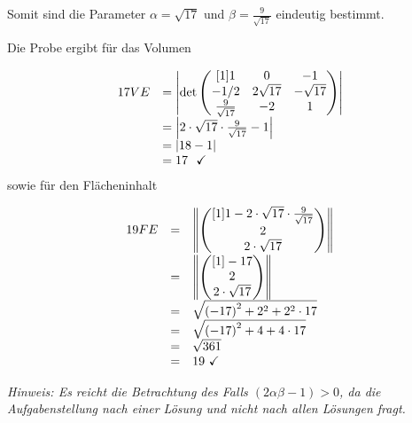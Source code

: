 \documentclass[main.tex]{subfiles}
\begin{document}
Somit sind die Parameter $\alpha =\sqrt{17}$ und $\beta =\frac{9}{\sqrt{17}}$ eindeutig bestimmt. 

Die Probe ergibt für das Volumen

\begin{equation*}
    \begin{array}{ r l }
    17VE & =\left| \det\begin{pmatrix}[1]
    1 & 0 & -1\\
    -1/2 & 2\sqrt{17} & -\sqrt{17}\\
    \frac{9}{\sqrt{17}} & -2 & 1
    \end{pmatrix}\right| \\
    & =\left| 2\cdot \sqrt{17} \cdot \frac{9}{\sqrt{17}} -1\right| \\
    & =| 18-1| \\
    & =17\ \ \checkmark 
    \end{array}
\end{equation*}
sowie für den Flächeninhalt

\begin{equation*}
    \begin{array}{ c r l }
        19FE & = & \left\| \begin{pmatrix}[1]
        1-2\cdot \sqrt{17} \cdot \frac{9}{\sqrt{17}}\\
        2\\
        2\cdot \sqrt{17}
        \end{pmatrix} \right\| \\
        & = & \left\| \begin{pmatrix}[1]
        -17\\
        2\\
        2\cdot \sqrt{17}
        \end{pmatrix} \right\| \\
        & = & \sqrt{{( -17)}^{2} +2^{2} +2^{2} \cdot 17}\\
        & = & \sqrt{{( -17)}^{2} +4+4\cdot 17}\\
        & = & \sqrt{361}\\
        & = & 19\ \checkmark 
    \end{array}
\end{equation*}

\textit{Hinweis: Es reicht die Betrachtung des Falls $(2\alpha\beta-1) > 0$, da die Aufgabenstellung nach einer Lösung und nicht nach allen Lösungen fragt.}
\end{document}
